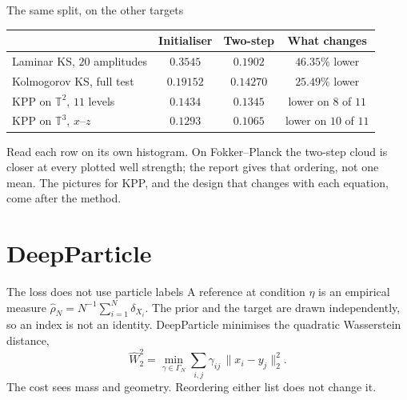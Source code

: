 \documentclass[aspectratio=169,11pt,t]{beamer}
\newcommand{\sectime}{}
\begin{document}
\begin{frame}{The same split, on the other targets}
  \small
  \begin{tabular}{@{}lccc@{}}
    \toprule
     & Initialiser & Two-step & What changes \\
    \midrule
    Laminar KS, $20$ amplitudes & $0.3545$ & $0.1902$ & $46.35\%$ lower \\
    Kolmogorov KS, full test & $0.19152$ & $0.14270$ & $25.49\%$ lower \\
    KPP on $\mathbb{T}^2$, $11$ levels & $0.1434$ & $0.1345$ & lower on $8$ of $11$ \\
    KPP on $\mathbb{T}^3$, $x$--$z$ & $0.1293$ & $0.1065$ & lower on $10$ of $11$ \\
    \bottomrule
  \end{tabular}
  \vspace{0.45em}
  \normalsize
  Read each row on its own histogram.
  On Fokker--Planck the two-step cloud is closer at every plotted well strength; the report gives that ordering, not one mean.
  The pictures for KPP, and the design that changes with each equation, come after the method.
\end{frame}

\renewcommand{\sectime}{About six minutes}
\section[DeepParticle]{DeepParticle}

\begin{frame}{The loss does not use particle labels}
  A reference at condition $\eta$ is an empirical measure
  \(
    \hat\rho_N=N^{-1}\sum_{i=1}^N\delta_{X_i}.
  \)
  The prior and the target are drawn independently, so an index is not an identity.
  \vspace{0.4em}
  DeepParticle minimises the quadratic Wasserstein distance,
  \[
    \widehat W_2^2
    =\min_{\gamma\in\Gamma_N}\sum_{i,j}\gamma_{ij}\,\|x_i-y_j\|_2^2.
  \]
  The cost sees mass and geometry.
  Reordering either list does not change it.
\end{frame}
\end{document}
